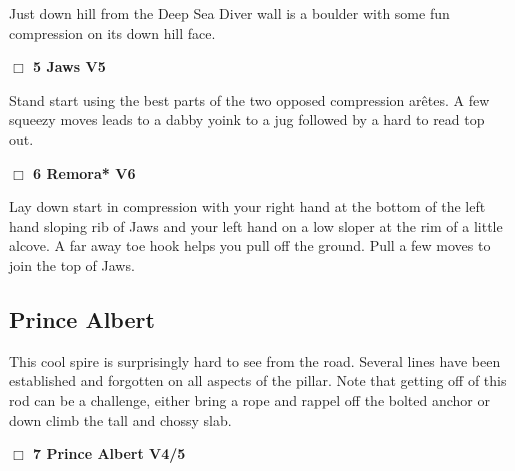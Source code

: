 \begin{multicols}{2}
Just down hill from the Deep Sea Diver wall is a boulder with some fun compression on its down hill face.\\



\needspace{2em}
\label{rt:Jaws}
\colorbox{RoyalBlue!20}{
\parbox{0.95\linewidth}{
\hspace{-1ex}\textbf{$\Box$
5 Jaws V5  
}}}
\begin{adjustwidth}{1.3em}{}			

Stand start using the best parts of the two opposed compression arêtes. A few squeezy moves leads to a dabby yoink to a jug followed by a hard to read top out.
\end{adjustwidth}




\needspace{2em}
\label{rt:Remora}
\colorbox{RoyalBlue!20}{
\parbox{0.95\linewidth}{
\hspace{-1ex}\textbf{$\Box$
6 Remora* V6  
}}}
\begin{adjustwidth}{1.3em}{}			

Lay down start in compression with your right hand at the bottom of the left hand sloping rib of Jaws and your left hand on a low sloper at the rim of a little alcove. A far away toe hook helps you pull off the ground. Pull a few moves to join the top of Jaws.
\end{adjustwidth}





\needspace{10em}
\subsection*{Prince Albert}\label{bf:Prince Albert}

This cool spire is surprisingly hard to see from the road. Several lines have been established and forgotten on all aspects of the pillar. Note that getting off of this rod can be a challenge, either bring a rope and rappel off the bolted anchor or down climb the tall and chossy slab.\\



\needspace{2em}
\label{rt:Prince Albert}
\colorbox{RoyalBlue!20}{
\parbox{0.95\linewidth}{
\hspace{-1ex}\textbf{$\Box$
7 Prince Albert V4/5  
}}}
\begin{adjustwidth}{1.3em}{}			


\end{adjustwidth}
\end{multicols}
